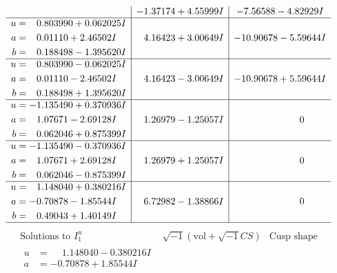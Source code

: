 \documentclass[1p]{elsarticle_modified}
\theoremstyle{definition}
\newcommand{\I}{\sqrt{-1}}
\begin{document}
$$\begin{array}{c|c|c}
 & -1.37174 + 4.55999 I & -7.56588 - 4.82929 I \\ \hline\begin{aligned}
u &= \phantom{-}0.803990 + 0.062025 I \\
a &= \phantom{-}0.01110 + 2.46502 I \\
b &= \phantom{-}0.188498 - 1.395620 I\end{aligned}
 & \phantom{-}4.16423 + 3.00649 I & -10.90678 - 5.59644 I \\ \hline\begin{aligned}
u &= \phantom{-}0.803990 - 0.062025 I \\
a &= \phantom{-}0.01110 - 2.46502 I \\
b &= \phantom{-}0.188498 + 1.395620 I\end{aligned}
 & \phantom{-}4.16423 - 3.00649 I & -10.90678 + 5.59644 I \\ \hline\begin{aligned}
u &= -1.135490 + 0.370936 I \\
a &= \phantom{-}1.07671 - 2.69128 I \\
b &= \phantom{-}0.062046 + 0.875399 I\end{aligned}
 & \phantom{-}1.26979 - 1.25057 I & \phantom{-0.000000 } 0 \\ \hline\begin{aligned}
u &= -1.135490 - 0.370936 I \\
a &= \phantom{-}1.07671 + 2.69128 I \\
b &= \phantom{-}0.062046 - 0.875399 I\end{aligned}
 & \phantom{-}1.26979 + 1.25057 I & \phantom{-0.000000 } 0 \\ \hline\begin{aligned}
u &= \phantom{-}1.148040 + 0.380216 I \\
a &= -0.70878 - 1.85544 I \\
b &= \phantom{-}0.49043 + 1.40149 I\end{aligned}
 & \phantom{-}6.72982 - 1.38866 I & \phantom{-0.000000 } 0\\
 \hline 
 \end{array}$$\newpage$$\begin{array}{c|c|c}  
\text{Solutions to }I^u_{1}& \I (\text{vol} + \sqrt{-1}CS) & \text{Cusp shape}\\
 \hline 
\begin{aligned}
u &= \phantom{-}1.148040 - 0.380216 I \\
a &= -0.70878 + 1.85544 I \\

\end{aligned}
\end{array}$$
\end{document}
